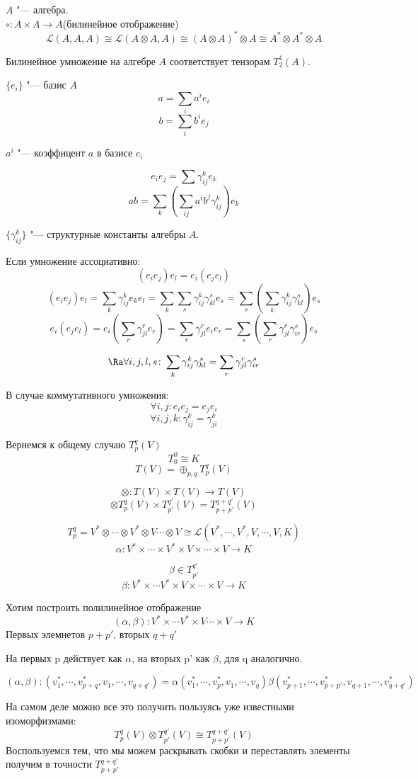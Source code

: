 $A$  "--- алгебра.\\
$\circ \colon A \times A \to A$(билинейное отображение)\\
$$\mathcal{L}(A, A, A) \cong \mathcal{L}(A \otimes A, A) \cong (A \otimes A)^* \otimes A \cong A^* \otimes A^* \otimes A$$

Билинейное умножение на алгебре $A$  соответствует тензорам $T_2^1(A)$.

$\{e_i\}$ "--- базис $A$
$$a = \sum_{i} a^i e_i$$
$$b = \sum_{i} b^i e_j$$

$a^i$ "--- коэффицент $a$ в базисе $e_i$

$$e_ie_j = \sum \gamma_{ij}^ke_k$$
$$ab = \sum_{k}(\sum_{ij}a^ib^j\gamma_{ij}^k)e_k$$

\begin{Def}
$\{\gamma_{ij}^k\}$ "--- структурные константы алгебры $A$.
\end{Def}

Если умножение ассоциативно:
    $$(e_ie_j)e_l = e_i(e_je_l)$$
    $$(e_ie_j)e_l = \sum_k\gamma_{ij}^ke_ke_l = \sum_{k}\sum_{s}\gamma_{ij}^k \gamma_{kl}^s e_s = \sum_s(\sum_k \gamma_{ij}^k \gamma_{kl}^s)e_s$$
    $$e_i(e_je_l) = e_i(\sum_r \gamma_{jl}^re_r) = \sum_{r}\gamma_{jl}^{r}e_ie_r = \sum_s(\sum_r \gamma_{jl}^r\gamma_{ir}^s)e_s$$

    $$\Ra \forall i, j, l, s \colon \sum_{k}\gamma_{ij}^k\gamma_{kl}^s = \sum_r\gamma_{jl}^r\gamma_{ir}^s$$

В случае коммутативного умножения:
    $$\forall i, j \colon e_ie_j = e_je_i$$
    $$\forall i, j, k \colon \gamma_{ij}^k = \gamma_{ji}^k$$


Вернемся  к общему случаю $T_p^q(V)$
$$T_0^0 \cong K$$
$$T(V) = \oplus_{p,q}T_{p}^{q}(V)$$

$$\otimes \colon T(V) \times T(V) \to T(V)$$
$$\otimes T_{p}^{q}(V) \times T_{p'}^{q'}(V) = T_{p + p'}^{q + q'}(V)$$

$$T_{p}^{q} = V^* \otimes \cdots \otimes V^* \otimes V \cdots \otimes V \cong \mathcal{L}(V^*, \cdots, V^*, V, \cdots, V, K)$$
$$\alpha\colon V^* \times \cdots \times V^* \times V \times \cdots \times V \to K$$

$$\beta \in T_{p'}^{q'}$$
$$\beta \colon V^* \times \cdots V^* \times V \times \cdots \times V \to K$$ 

Хотим построить полилинейное отображение 
$$(\alpha, \beta)\colon V^* \times \cdots V^* \times V \cdots \times V \to K$$ 
Первых элемнетов $p + p'$, вторых $q + q'$

На первых p действует как $\alpha$, на вторых p' как $\beta$, для q аналогично. 

$$(\alpha, \beta) \colon (v_1^*, \cdots, v_{p + q}^*, v_1, \cdots, v_{q + q'}) = \alpha(v_1^*, \cdots, v_p^*, v_1, \cdots, v_q)\beta(v_{p + 1}^*, \cdots, v_{p + p'}^*, v_{q + 1}, \cdots, v^*_{q + q'})$$

На самом деле можно все это получить пользуясь уже известными изоморфизмами:
    $$T_{p}^q(V) \otimes T_{p'}^{q'}(V) \cong T_{p + p'}^{q + q'}(V)$$
    Воспользуемся тем, что мы можем раскрывать скобки и переставлять элементы получим в точности $T_{p + p'}^{q + q'}$
   
